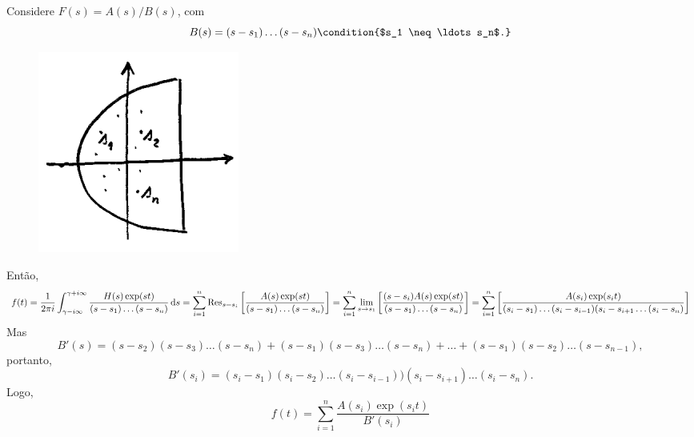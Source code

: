 \begin{exem}
  Considere $F(s) = A(s) / B(s)$, com
  \begin{dmath*}
    B(s) = (s - s_1) \ldots (s - s_n) \condition{$s_1 \neq \ldots s_n$.}
  \end{dmath*}
  \begin{figure}[htb]
    \centering
    \includegraphics{figuras/14-3}
  \end{figure}
  Então,
  \begin{dmath*}
    f(t) = \frac{1}{2 \pi i} \int_{\gamma - i \infty}^{\gamma + i \infty}
    \frac{H(s) \exp(s t)}{(s - s_1) \ldots (s - s_n)} \vi{s}
    = \sum_{i = 1}^n \Res_{s = s_i} \left[ \frac{A(s) \exp(s t)}{(s - s_1)
    \ldots (s - s_n)} \right]
    = \sum_{i = 1}^n \lim_{s \to s_1} \left[ \frac{(s - s_i) A(s) \exp(s t)}{(s
    - s_1) \ldots (s - s_n)} \right]
    = \sum_{i = 1}^n \left[ \frac{A(s_i) \exp(s_i t)}{(s_i - s_1) \ldots (s_i -
    s_{i - 1}) (s_i - s_{i + 1} \ldots (s_i - s_n)} \right]
  \end{dmath*}
  Mas
  \begin{dmath*}
    B'(s) = (s - s_2) (s - s_3) \ldots (s - s_n) + (s - s_1) (s - s_3) \ldots (s
    - s_n) + \ldots + (s - s_1) (s - s_2) \ldots (s - s_{n - 1}),
  \end{dmath*}
  portanto,
  \begin{dmath*}
    B'(s_i) = (s_i - s_1) (s_i - s_2) \ldots (s_i - s_{i - 1})) (s_i - s_{i +
    1}) \ldots (s_i - s_n).
  \end{dmath*}
  Logo,
  \begin{dmath*}
    f(t) = \sum_{i = 1}^n \frac{A(s_i) \exp(s_i t)}{B'(s_i)}
  \end{dmath*}
\end{exem}

